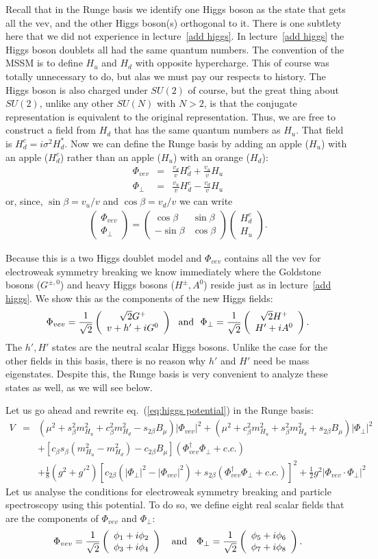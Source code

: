 \documentclass[12pt]{article}
\def\beq{\begin{eqnarray}}
\def\eeq{\end{eqnarray}}
\def\eq#1{eq.~(\ref{#1})}
\def\vector#1#2{\left( \begin{array}{c}#1\\ #2\end{array}\right)}
\begin{document}
Recall that in the Runge basis we identify one Higgs boson as the state that gets all the vev, and the other Higgs boson(s) orthogonal to it. There is one subtlety here that we did not experience in lecture~\ref{add higgs}. In lecture~\ref{add higgs} the Higgs boson doublets all had the same quantum numbers. The convention of the MSSM is to define $H_u$ and $H_d$ with opposite hypercharge. This of course was totally unnecessary to do, but alas we must pay our respects to history.  The Higgs boson is also charged under $SU(2)$ of course, but the great thing about $SU(2)$, unlike any other $SU(N)$ with $N>2$, is that the conjugate representation is equivalent to the original representation.  Thus, we are free to construct a field from $H_d$ that has the same quantum numbers as $H_u$. That field is $H^c_d=i\sigma^2H_d^*$.  Now we can define the Runge basis by adding an apple ($H_u$) with an apple ($H_d^c$) rather than an apple ($H_u$) with an orange ($H_d$):
\beq
\Phi_{vev}&=& \frac{v_d}{v}H_d^c+ \frac{v_u}{v}H_u \\
\Phi_\perp &=& \frac{v_u}{v}H_d^c-\frac{v_d}{v}H_u
\eeq
or, since, $\sin\beta=v_u/v$ and $\cos\beta=v_d/v$ we can write
\beq
\vector{\Phi_{vev}}{\Phi_\perp}=\left( \begin{array}{cc} \cos\beta & \sin\beta \\ -\sin\beta & \cos\beta
\end{array}\right)\vector{H^c_d}{H_u}.
\eeq

Because this is a two Higgs doublet model and $\Phi_{vev}$ contains all the vev for electroweak symmetry breaking we know immediately where the Goldstone bosons ($G^{\pm,0}$) and heavy Higgs bosons ($H^\pm,A^0$) reside just as in lecture~\ref{add higgs}. We show this as the components of the new Higgs fields:
\beq
\Phi_{vev}=\frac{1}{\sqrt{2}}\vector{\sqrt{2}G^+}{v+h'+iG^0}~~{\rm and}~~
\Phi_{\perp}=\frac{1}{\sqrt{2}}\vector{\sqrt{2}H^+}{H'+iA^0}.
\eeq
The $h',H'$ states are the neutral scalar Higgs bosons. Unlike the case for the other fields in this basis, there is no reason why $h'$ and $H'$ need be mass eigenstates. Despite this, the Runge basis is very convenient to analyze these states as well, as we will see below.

Let us go ahead and rewrite \eq{eq:higgs potential} in the Runge basis:
\beq
V&=& (\mu^2+s_\beta^2m^2_{H_u}+c_\beta^2m^2_{H_d}-s_{2\beta}B_\mu)|\Phi_{vev}|^2
+(\mu^2+c_\beta^2 m^2_{H_u}+s_\beta^2 m_{H_d}^2+s_{2\beta}B_\mu)|\Phi_\perp|^2 \nonumber \\
& & +\left[c_\beta s_\beta (m_{H_u}^2-m_{H_d}^2)-c_{2\beta}B_\mu\right]
(\Phi^\dagger_{vev}\Phi_\perp+c.c.) \label{eq:higgs runge} \\
&& +\frac{1}{8}(g^2+g'^2)\left[c_{2\beta}(|\Phi_\perp|^2-|\Phi_{vev}|^2)+s_{2\beta}(\Phi_{vev}^\dagger
\Phi_\perp +c.c.)\right]^2 +\frac{1}{2}g^2|\Phi_{vev}\cdot \Phi_\perp|^2 \nonumber
\eeq
Let us analyse the conditions for electroweak symmetry breaking and particle spectroscopy using this potential.  To do so, we define eight real scalar fields that are the components of $\Phi_{vev}$ and $\Phi_\perp$:
\beq
\Phi_{vev}=\frac{1}{\sqrt{2}}\vector{\phi_1+i\phi_2}{\phi_3+i\phi_4}~~~{\rm and}~~~
\Phi_\perp=\frac{1}{\sqrt{2}}\vector{\phi_5+i\phi_6}{\phi_7+i\phi_8}.
\eeq
\end{document}
